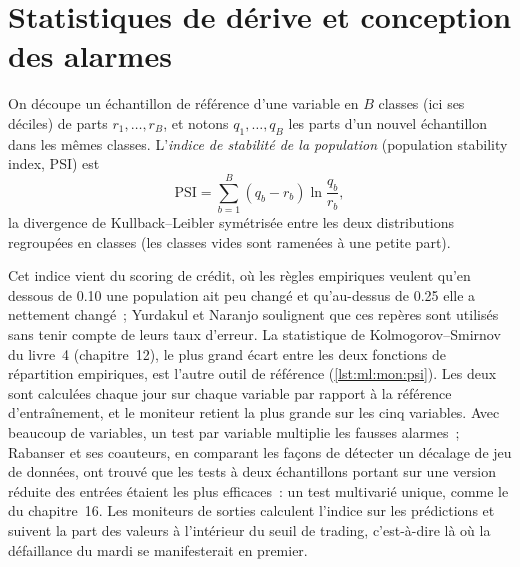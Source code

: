 \section{Statistiques de dérive et conception des alarmes}

\begin{definition}\label{def:ml:monitoring-and-retraining:psi}
On découpe un échantillon de référence d'une variable en $B$ classes (ici ses déciles) de parts $r_1,\dots,r_B$, et notons $q_1,\dots,q_B$ les
parts d'un nouvel échantillon dans les mêmes classes. L'\emph{indice de stabilité de la population} (population stability index, PSI) est
\[
\mathrm{PSI}=\sum_{b=1}^{B}(q_b-r_b)\ln\frac{q_b}{r_b},
\]
la divergence de Kullback--Leibler symétrisée entre les deux distributions regroupées en classes (les classes vides sont ramenées à une petite part).
\end{definition}

Cet indice vient du scoring de crédit, où les règles empiriques veulent qu'en dessous de 0.10 une population ait peu changé et qu'au-dessus de 0.25
elle a nettement changé~; Yurdakul et Naranjo soulignent que ces repères sont utilisés sans tenir compte de leurs
taux d'erreur. La statistique de Kolmogorov--Smirnov du livre~4 (chapitre~12), le plus grand écart entre les deux fonctions de répartition
empiriques, est l'autre outil de référence (\cref{lst:ml:mon:psi}). Les deux sont calculées chaque jour sur chaque variable par rapport à la
référence d'entraînement, et le moniteur retient la plus grande sur les cinq variables. Avec beaucoup de variables, un test par variable multiplie les
fausses alarmes~; Rabanser et ses coauteurs, en comparant les façons de détecter un décalage de jeu de données, ont trouvé que les tests à deux échantillons portant sur une version réduite
des entrées étaient les plus efficaces~: un test multivarié unique, comme le  du chapitre~16. Les moniteurs de sorties calculent l'indice sur les prédictions
et suivent la part des valeurs à l'intérieur du seuil de trading, c'est-à-dire là où la défaillance du mardi se manifesterait en premier.

